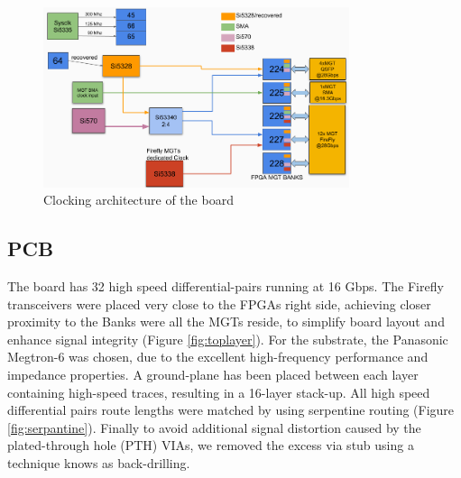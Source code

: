 \documentclass[a4paper]{PoS}
\begin{document}
\begin{figure}[h]
\centering
\includegraphics[width=0.8\textwidth]{clocking.png}
\caption{ Clocking architecture of the board}
\label{clocking}
\end{figure}


\subsection{PCB}
The board has 32 high speed differential-pairs running at 16 Gbps. The Firefly transceivers were placed very close to the FPGAs right side, achieving closer proximity to the Banks were all the MGTs reside, to simplify board layout and enhance signal integrity (Figure \ref{fig:toplayer}). For the substrate, the Panasonic Megtron-6 was chosen, due to the excellent high-frequency performance and impedance properties. A ground-plane has been placed between each layer containing high-speed traces, resulting in a 16-layer stack-up. All high speed differential pairs route lengths were matched by using serpentine routing (Figure \ref{fig:serpantine}). Finally to avoid additional signal distortion caused by the plated-through hole (PTH) VIAs, we removed the excess via stub using a technique knows as back-drilling.
\end{document}
